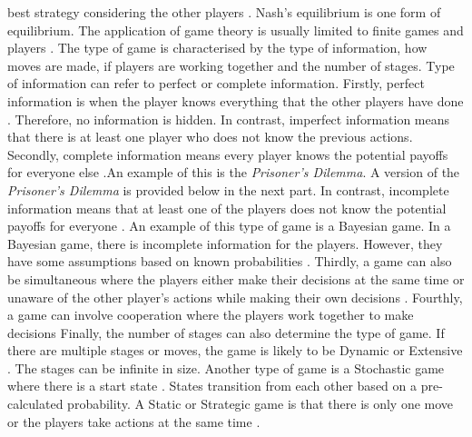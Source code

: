 best strategy considering the other players \cite{liang2010studying}. Nash's equilibrium is one form of equilibrium.
\newline\newline
The application of game theory is usually limited to finite games
and players \cite{owen2001empirical}. The type of game is characterised by the type of information, how moves are made, if players
are working together and the number of stages. Type of information can refer to perfect or complete information.
\newline\newline
Firstly, perfect
information is when the player knows everything that the other players
have done \cite{huang2018resource}. Therefore, no information
is hidden. In contrast, imperfect information means that there is at
least one player who does not know the previous actions. 
\newline\newline
Secondly,
complete information means every player knows the potential payoffs for
everyone else \cite{guglielmi2018bayesian}.An example of this is the \emph{Prisoner's Dilemma}. A version of the
\emph{Prisoner's Dilemma} is provided below in the next part. In contrast, incomplete
information means that at least one of the players does not know the
potential payoffs for everyone \cite{liang2010studying}. An example of this
type of game is a Bayesian game. In a Bayesian game, there is incomplete
information for the players. However, they have some assumptions based
on known probabilities \cite{liu2006}. 
\newline\newline
Thirdly, a game
can also be simultaneous where the players either make their decisions
at the same time or unaware of the other player's actions while making
their own decisions \cite{savani2015game}. Fourthly, a game can
involve cooperation where the players work together to make decisions \cite{martinez2016formal}
\newline\newline
Finally, the number of stages can also determine the type of game.
If there are multiple stages or moves, the game is likely to be
Dynamic or Extensive \cite{owen2001empirical}. The stages can be infinite in size. Another
type of game is a Stochastic game where there is a start state \cite{liu2006}. States transition from each other based on a pre-calculated
probability. A Static or Strategic game is that there is only one move
or the players take actions at the same time \cite{Lye:2005:GSN:2701748.2701812}.
